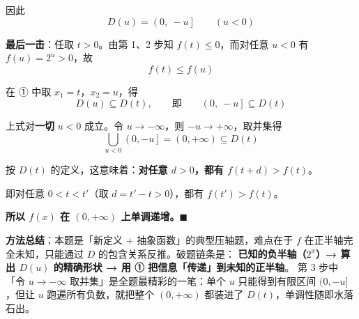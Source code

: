 因此
\[D(u)=\left(0,\ -u\right]\qquad(u<0)\]

\textbf{最后一击}：任取 $t>0$。由第 1、2 步知 $f(t)\le0$，而对任意 $u<0$ 有 $f(u)=2^{u}>0$，故
\[f(t)\le f(u)\]

在 ① 中取 $x_1=t$，$x_2=u$，得
\[D(u)\subseteq D(t),\qquad\text{即}\qquad\left(0,\ -u\right]\subseteq D(t)\]

上式对\textbf{一切} $u<0$ 成立。令 $u\to-\infty$，则 $-u\to+\infty$，取并集得
\[\bigcup_{u<0}\left(0,-u\right]=(0,+\infty)\subseteq D(t)\]

按 $D(t)$ 的定义，这意味着：\textbf{对任意 $d>0$，都有 $f(t+d)>f(t)$}。

即对任意 $0<t<t'$（取 $d=t'-t>0$），都有 $f(t')>f(t)$。

\textbf{所以 $f(x)$ 在 $(0,+\infty)$ 上单调递增。$\blacksquare$}

\begin{gktip}
\textbf{方法总结}：本题是「新定义 + 抽象函数」的典型压轴题，难点在于 $f$ 在正半轴完全未知，只能通过 $D$ 的包含关系反推。破题链条是：
\textbf{已知的负半轴（$2^x$）→ 算出 $D(u)$ 的精确形状 → 用 ① 把信息「传递」到未知的正半轴}。
第 3 步中「令 $u\to-\infty$ 取并集」是全题最精彩的一笔：单个 $u$ 只能得到有限区间 $(0,-u]$，但让 $u$ 跑遍所有负数，就把整个 $(0,+\infty)$ 都装进了 $D(t)$，单调性随即水落石出。
\end{gktip}
